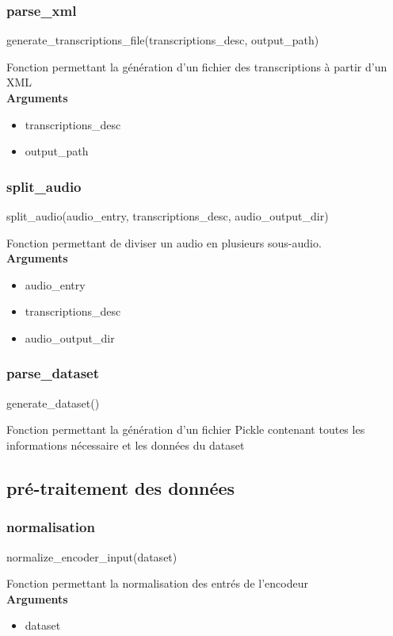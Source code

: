     \subsubsection{parse\_xml}
    \begin{tcolorbox}
    generate\_transcriptions\_file(transcriptions\_desc, output\_path)
    \end{tcolorbox}
    Fonction permettant la génération d'un fichier des transcriptions à partir d'un XML \\
    \textbf{Arguments}
    \begin{itemize}
        \item transcriptions\_desc
        \item output\_path
    \end{itemize}
    
    \subsubsection{split\_audio}
    \begin{tcolorbox}
    split\_audio(audio\_entry, transcriptions\_desc, audio\_output\_dir)
    \end{tcolorbox}
    Fonction permettant de diviser un audio en plusieurs sous-audio. \\
    \textbf{Arguments}
    \begin{itemize}
        \item audio\_entry
        \item transcriptions\_desc
        \item audio\_output\_dir
    \end{itemize}
    \subsubsection{parse\_dataset}
    \begin{tcolorbox}
    generate\_dataset()
    \end{tcolorbox}
    Fonction permettant la génération d'un fichier Pickle contenant toutes les informations nécessaire et les données du dataset 
    
    \subsection{pré-traitement des données}
    \subsubsection{normalisation}
    \begin{tcolorbox}
    normalize\_encoder\_input(dataset)
    \end{tcolorbox}
    Fonction permettant la normalisation des entrés de l'encodeur \\
    \textbf{Arguments}
    \begin{itemize}
        \item dataset
    \end{itemize}
